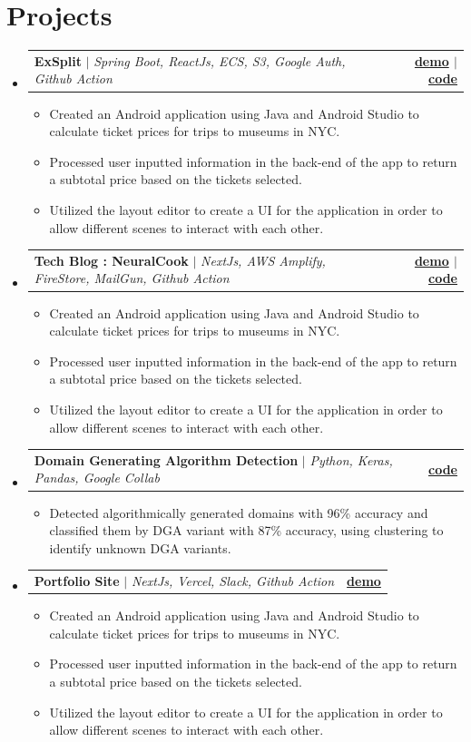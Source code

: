 \documentclass[letterpaper,11pt]{article}
\makeatletter
\newcommand{\resumeItem}[1]{
  \item\small{
    {#1 \vspace{-2pt}}
  }
}
\newcommand{\resumeProjectHeading}[2]{
    \item
    \begin{tabular*}{1.001\textwidth}{l@{\extracolsep{\fill}}r}
      \small#1 & \textbf{\small #2}\\
    \end{tabular*}\vspace{-7pt}
}
\newcommand{\resumeSubHeadingListStart}{\begin{itemize}[leftmargin=0.0in, label={}]}
\newcommand{\resumeSubHeadingListEnd}{\end{itemize}}
\newcommand{\resumeItemListStart}{\begin{itemize}}
\newcommand{\resumeItemListEnd}{\end{itemize}\vspace{-5pt}}
\makeatother
\begin{document}
\section{Projects}
\vspace{-5pt}
\resumeSubHeadingListStart
\resumeProjectHeading
{\textbf{ExSplit} $|$ \emph{Spring Boot, ReactJs, ECS, S3, Google Auth, Github Action}}{\href{}{demo} $|$ \href{}{code}}
\resumeItemListStart
\resumeItem{Created an Android application using Java and Android Studio to calculate ticket prices for trips to museums in NYC.}
\resumeItem{Processed user inputted information in the back-end of the app to return a subtotal price based on the tickets selected.}
\resumeItem{Utilized the layout editor to create a UI for the application in order to allow different scenes to interact with each other.}
\resumeItemListEnd
\vspace{-13pt}
\resumeProjectHeading
{\textbf{Tech Blog : NeuralCook} $|$ \emph{NextJs, AWS Amplify, FireStore, MailGun, Github Action}}{\href{}{demo} $|$ \href{}{code}}
\resumeItemListStart
\resumeItem{Created an Android application using Java and Android Studio to calculate ticket prices for trips to museums in NYC.}
\resumeItem{Processed user inputted information in the back-end of the app to return a subtotal price based on the tickets selected.}
\resumeItem{Utilized the layout editor to create a UI for the application in order to allow different scenes to interact with each other.}
\resumeItemListEnd
\vspace{-13pt}
\resumeProjectHeading
{\textbf{Domain Generating Algorithm Detection} $|$ \emph{Python, Keras, Pandas, Google Collab}}{\href{}{code}}
\resumeItemListStart
\resumeItem{Detected algorithmically generated domains with 96\% accuracy and classified them by DGA variant with 87\% accuracy, using clustering to identify unknown DGA variants.}
\resumeItemListEnd
\vspace{-13pt}
\resumeProjectHeading
{\textbf{Portfolio Site} $|$ \emph{NextJs, Vercel, Slack,  Github Action}}{\href{}{demo}}
\resumeItemListStart
\resumeItem{Created an Android application using Java and Android Studio to calculate ticket prices for trips to museums in NYC.}
\resumeItem{Processed user inputted information in the back-end of the app to return a subtotal price based on the tickets selected.}
\resumeItem{Utilized the layout editor to create a UI for the application in order to allow different scenes to interact with each other.}
\resumeItemListEnd
\resumeSubHeadingListEnd
\vspace{-15pt}
\end{document}
